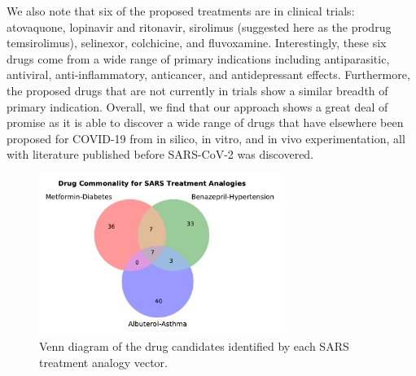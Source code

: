 \documentclass{article}
\begin{document}
We also note that six of the proposed treatments are in clinical trials: atovaquone, lopinavir and ritonavir, sirolimus (suggested here as the prodrug temsirolimus), selinexor, colchicine, and fluvoxamine.
Interestingly, these six drugs come from a wide range of primary indications including antiparasitic, antiviral, anti-inflammatory, anticancer, and antidepressant effects.
Furthermore, the proposed drugs that are not currently in trials show a similar breadth of primary indication.
Overall, we find that our approach shows a great deal of promise as it is able to discover a wide range of drugs that have elsewhere been proposed for COVID-19 from in silico, in vitro, and in vivo experimentation, all with literature published before SARS-CoV-2 was discovered.


\begin{figure}
\centering
\includegraphics[width=0.7\textwidth]{drugvenn}
\caption{Venn diagram of the drug candidates identified by each SARS treatment analogy vector.}
\label{fig:drug_venn}
\end{figure}
\end{document}
